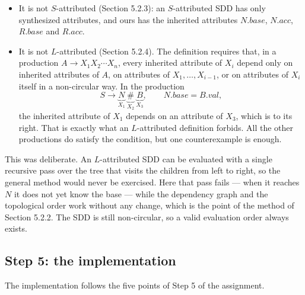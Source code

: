 \documentclass[11pt]{article}
\begin{document}
\begin{itemize}
  \item It is not $S$-attributed (Section 5.2.3): an $S$-attributed SDD has only
        synthesized attributes, and ours has the inherited attributes
        $N.base$, $N.acc$, $R.base$ and $R.acc$.

  \item It is not $L$-attributed (Section 5.2.4). The definition requires that, in a
        production $A \rightarrow X_1 X_2 \cdots X_n$, every inherited attribute of
        $X_i$ depend only on inherited attributes of $A$, on attributes of
        $X_1,\dots,X_{i-1}$, or on attributes of $X_i$ itself in a non-circular way. In
        the production
        \[
          S \rightarrow \underbrace{N}_{X_1}\ \underbrace{\texttt{\#}}_{X_2}\ \underbrace{B}_{X_3},
          \qquad N.base = B.val,
        \]
        the inherited attribute of $X_1$ depends on an attribute of $X_3$, which is to
        its right. That is exactly what an $L$-attributed definition forbids. All the
        other productions do satisfy the condition, but one counterexample is enough.
\end{itemize}

This was deliberate. An $L$-attributed SDD can be evaluated with a single recursive
pass over the tree that visits the children from left to right, so the general method
would never be exercised. Here that pass fails --- when it reaches $N$ it does not yet
know the base --- while the dependency graph and the topological order work without any
change, which is the point of the method of Section 5.2.2. The SDD is still
non-circular, so a valid evaluation order always exists.

\subsection{Step 5: the implementation}

The implementation follows the five points of Step 5 of the assignment.
\end{document}
